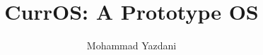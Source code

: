 \documentclass[letterpaper,twocolumn,10pt]{article}
\begin{document}
\setlength{\pdfpageheight}{\paperheight}
\setlength{\pdfpagewidth}{\paperwidth}

\title{CurrOS: A Prototype OS}

\author{Mohammad Yazdani}

\maketitle

%


%
%
\end{document}
